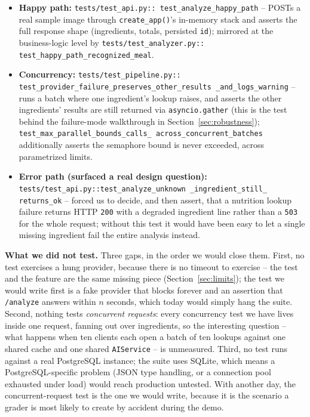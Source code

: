 \documentclass[11pt,a4paper]{article}
\begin{document}
\begin{itemize}[leftmargin=1.4em,itemsep=3pt]
  \item \textbf{Happy path:} \texttt{tests/test\_api.py::
  test\_analyze\_happy\_path} -- POSTs a real sample image through
  \texttt{create\_app()}'s in-memory stack and asserts the full response
  shape (ingredients, totals, persisted \texttt{id}); mirrored at the
  business-logic level by \texttt{tests/test\_analyzer.py::
  test\_happy\_path\_recognized\_meal}.
  \item \textbf{Concurrency:} \texttt{tests/test\_pipeline.py::
  test\_provider\_failure\_preserves\_other\_results
  \_and\_logs\_warning}
  -- runs a batch where one ingredient's lookup raises, and asserts the
  other ingredients' results are still returned via \texttt{asyncio.gather}
  (this is the test behind the failure-mode walkthrough in
  Section~\ref{sec:robustness}); \texttt{test\_max\_parallel\_bounds\_calls\_
  across\_concurrent\_batches} additionally asserts the semaphore bound is
  never exceeded, across parametrized limits.
  \item \textbf{Error path (surfaced a real design question):}
  \texttt{tests/test\_api.py::test\_analyze\_unknown
\_ingredient\_still\_
  returns\_ok} -- forced us to decide, and then assert, that a nutrition
  lookup failure returns HTTP \texttt{200} with a degraded ingredient
  line rather than a \texttt{503} for the whole request; without this test
  it would have been easy to let a single missing ingredient fail the
  entire analysis instead.
\end{itemize}

\par\noindent
\textbf{What we did not test.} Three gaps, in the order we would close
them. First, no test exercises a hung provider, because there is no
timeout to exercise -- the test and the feature are the same missing piece
(Section~\ref{sec:limits}); the test we would write first is a fake
provider that blocks forever and an assertion that \texttt{/analyze}
answers within $n$ seconds, which today would simply hang the suite.
Second, nothing tests \emph{concurrent requests}: every concurrency test
we have lives inside one request, fanning out over ingredients, so the
interesting question -- what happens when ten clients each open a batch of
ten lookups against one shared cache and one shared \texttt{AIService} --
is unmeasured. Third, no test runs against a real PostgreSQL instance;
the suite uses SQLite, which means a PostgreSQL-specific problem (JSON
type handling, or a connection pool exhausted under load) would reach
production untested. With another day, the concurrent-request test is the
one we would write, because it is the scenario a grader is most likely to
create by accident during the demo.
\end{document}
